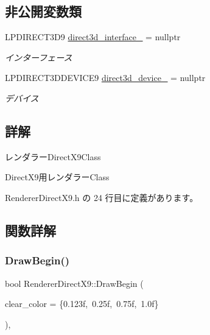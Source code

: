 \subsection*{非公開変数類}
\begin{DoxyCompactItemize}
\item 
L\+P\+D\+I\+R\+E\+C\+T3\+D9 \mbox{\hyperlink{class_renderer_direct_x9_a1616ee343f701fe647ed8d1727c8229d}{direct3d\+\_\+interface\+\_\+}} = nullptr
\begin{DoxyCompactList}\small\item\em インターフェース \end{DoxyCompactList}\item 
L\+P\+D\+I\+R\+E\+C\+T3\+D\+D\+E\+V\+I\+C\+E9 \mbox{\hyperlink{class_renderer_direct_x9_aba9ae366d583e965418423ec76454a61}{direct3d\+\_\+device\+\_\+}} = nullptr
\begin{DoxyCompactList}\small\item\em デバイス \end{DoxyCompactList}\end{DoxyCompactItemize}


\subsection{詳解}
レンダラー\+Direct\+X9\+Class 

Direct\+X9用レンダラー\+Class 

 Renderer\+Direct\+X9.\+h の 24 行目に定義があります。



\subsection{関数詳解}
\mbox{\label{class_renderer_direct_x9_a5d299c19850d7c87340c3cbf2629cc01}} 
\subsubsection{\texorpdfstring{Draw\+Begin()}{DrawBegin()}}
{\footnotesize\ttfamily bool Renderer\+Direct\+X9\+::\+Draw\+Begin (\begin{DoxyParamCaption}\item[{\mbox{\hyperlink{_vector3_d_8h_a680c30c4a07d86fe763c7e01169cd6cc}{X\+Color4}}}]{clear\+\_\+color = {\ttfamily \{0.123f,~0.25f,~0.75f,~1.0f\}} }\end{DoxyParamCaption})\hspace{0.3cm}{\ttfamily [override]}, {\ttfamily [virtual]}}



